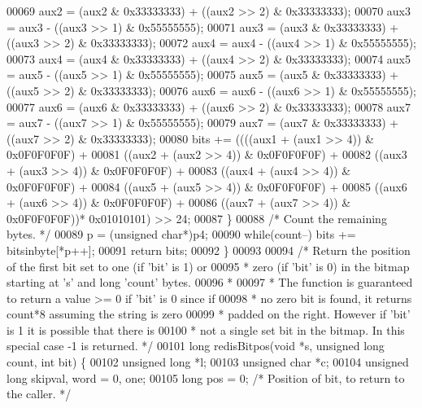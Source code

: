 \begin{DoxyCode}
00069         aux2 = (aux2 & 0x33333333) + ((aux2 >> 2) & 0x33333333);
00070         aux3 = aux3 - ((aux3 >> 1) & 0x55555555);
00071         aux3 = (aux3 & 0x33333333) + ((aux3 >> 2) & 0x33333333);
00072         aux4 = aux4 - ((aux4 >> 1) & 0x55555555);
00073         aux4 = (aux4 & 0x33333333) + ((aux4 >> 2) & 0x33333333);
00074         aux5 = aux5 - ((aux5 >> 1) & 0x55555555);
00075         aux5 = (aux5 & 0x33333333) + ((aux5 >> 2) & 0x33333333);
00076         aux6 = aux6 - ((aux6 >> 1) & 0x55555555);
00077         aux6 = (aux6 & 0x33333333) + ((aux6 >> 2) & 0x33333333);
00078         aux7 = aux7 - ((aux7 >> 1) & 0x55555555);
00079         aux7 = (aux7 & 0x33333333) + ((aux7 >> 2) & 0x33333333);
00080         bits += ((((aux1 + (aux1 >> 4)) & 0x0F0F0F0F) +
00081                     ((aux2 + (aux2 >> 4)) & 0x0F0F0F0F) +
00082                     ((aux3 + (aux3 >> 4)) & 0x0F0F0F0F) +
00083                     ((aux4 + (aux4 >> 4)) & 0x0F0F0F0F) +
00084                     ((aux5 + (aux5 >> 4)) & 0x0F0F0F0F) +
00085                     ((aux6 + (aux6 >> 4)) & 0x0F0F0F0F) +
00086                     ((aux7 + (aux7 >> 4)) & 0x0F0F0F0F))* 0x01010101) >> 24;
00087     \}
00088     \textcolor{comment}{/* Count the remaining bytes. */}
00089     p = (\textcolor{keywordtype}{unsigned} \textcolor{keywordtype}{char}*)p4;
00090     \textcolor{keywordflow}{while}(count--) bits += bitsinbyte[*p++];
00091     \textcolor{keywordflow}{return} bits;
00092 \}
00093 
00094 \textcolor{comment}{/* Return the position of the first bit set to one (if 'bit' is 1) or}
00095 \textcolor{comment}{ * zero (if 'bit' is 0) in the bitmap starting at 's' and long 'count' bytes.}
00096 \textcolor{comment}{ *}
00097 \textcolor{comment}{ * The function is guaranteed to return a value >= 0 if 'bit' is 0 since if}
00098 \textcolor{comment}{ * no zero bit is found, it returns count*8 assuming the string is zero}
00099 \textcolor{comment}{ * padded on the right. However if 'bit' is 1 it is possible that there is}
00100 \textcolor{comment}{ * not a single set bit in the bitmap. In this special case -1 is returned. */}
00101 \textcolor{keywordtype}{long} redisBitpos(\textcolor{keywordtype}{void} *s, \textcolor{keywordtype}{unsigned} \textcolor{keywordtype}{long} count, \textcolor{keywordtype}{int} bit) \{
00102     \textcolor{keywordtype}{unsigned} \textcolor{keywordtype}{long} *l;
00103     \textcolor{keywordtype}{unsigned} \textcolor{keywordtype}{char} *c;
00104     \textcolor{keywordtype}{unsigned} \textcolor{keywordtype}{long} skipval, word = 0, one;
00105     \textcolor{keywordtype}{long} pos = 0; \textcolor{comment}{/* Position of bit, to return to the caller. */}

\end{DoxyCode}
